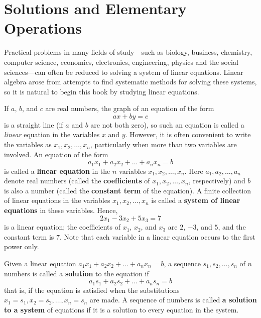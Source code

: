 \section{Solutions and Elementary Operations}
\label{sec:1_1}

Practical problems in many fields of study---such as biology, business, chemistry, computer science, economics, electronics, engineering, physics and the social sciences---can often be reduced to solving a system of linear equations. Linear algebra arose from attempts to find systematic methods for solving these systems, so it is natural to begin this book by studying linear equations.

If $a$, $b$, and $c$ are real numbers, the graph of an equation of the form
\begin{equation*}
ax + by = c
\end{equation*}
is a straight line (if $a$ and $b$ are not both zero), so such an equation is called a \textit{linear} equation in the variables $x$ and $y$. However, it is often convenient to write the variables as $x_1, x_2, \dots, x_n$, particularly when more than two variables are involved. An equation of the form
\begin{equation*}
a_1x_1 + a_2x_2 + \dots + a_nx_n = b
\end{equation*}
is called a \textbf{linear equation} in the $n$ variables $x_1, x_2, \dots, x_n$. Here $a_1, a_2, \dots, a_n$ denote real numbers (called the \textbf{coefficients} of $x_1, x_2, \dots, x_n$, respectively) and $b$ is also a number (called the \textbf{constant term} of the equation). A finite collection of linear equations in the variables $x_1, x_2, \dots, x_n$ is called a \textbf{system of linear equations} in these variables. Hence,
\begin{equation*}
2x_1 - 3x_2 + 5x_3 = 7
\end{equation*}
is a linear equation; the coefficients of $x_1$, $x_2$, and $x_3$ are $2$, $-3$, and $5$, and the constant term is $7$. Note that each variable in a linear equation occurs to the first power only.

Given a linear equation $a_1x_1 + a_2x_2 + \dots  + a_nx_n = b$, a sequence $s_1, s_2, \dots, s_n$ of $n$ numbers is called a \textbf{solution} to the equation if
\begin{equation*}
a_1s_1 + a_2s_2 + \dots + a_ns_n = b
\end{equation*}
that is, if the equation is satisfied when the substitutions $x_1 = s_1, x_2 = s_2, \dots, x_n = s_n$ are made. A sequence of numbers is called \textbf{a solution to a system} of equations if it is a solution to every equation in the system.

